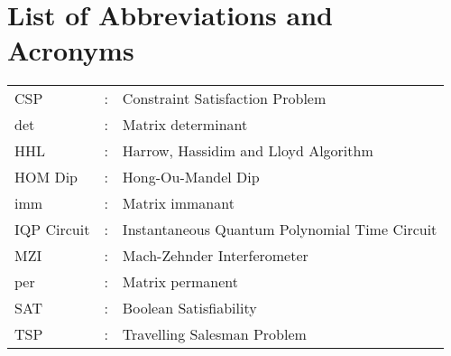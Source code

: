 \chapter*{List of Abbreviations and Acronyms}

\begin{tabular}{lcl}
CSP                 &:     & Constraint Satisfaction Problem\\
det &: & Matrix determinant\\
HHL &: & Harrow, Hassidim and Lloyd Algorithm\\
HOM Dip &: & Hong-Ou-Mandel Dip\\
imm &: & Matrix immanant\\
IQP Circuit &: & Instantaneous Quantum Polynomial Time Circuit\\
MZI &: & Mach-Zehnder Interferometer\\
per &: & Matrix permanent\\
SAT                 &:     & Boolean Satisfiability\\
TSP                 &:     & Travelling Salesman Problem\\
\end{tabular}
